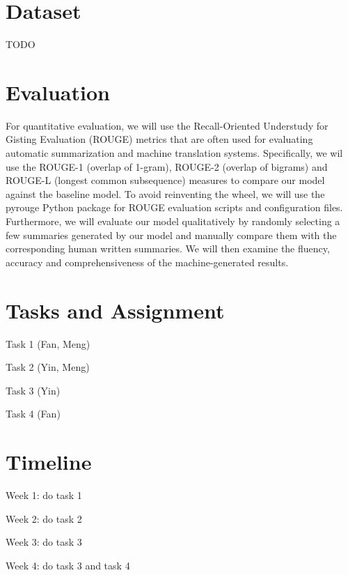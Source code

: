 \section{Dataset}
TODO

\section{Evaluation}
For quantitative evaluation, we will use the Recall-Oriented Understudy for Gisting Evaluation (ROUGE) metrics that are often used for evaluating automatic summarization and machine translation systems. Specifically, we wil use the ROUGE-1 (overlap of 1-gram), ROUGE-2 (overlap of bigrams) and ROUGE-L (longest common subsequence) measures to compare our model against the baseline model. To avoid reinventing the wheel, we will use the pyrouge  Python package for ROUGE evaluation scripts and configuration files.  Furthermore, we will evaluate our model qualitatively by randomly selecting a few summaries generated by our model and manually compare them with the corresponding human written summaries. We will then examine the fluency, accuracy and comprehensiveness of the machine-generated results.

\section{Tasks and Assignment}

\begin{compactitem}
\item Task 1 (Fan, Meng)
\item Task 2 (Yin, Meng)
\item Task 3 (Yin)
\item Task 4 (Fan)
\end{compactitem}


\section{Timeline}
\begin{compactitem}
\item Week 1: do task 1
\item Week 2: do task 2
\item Week 3: do task 3
\item Week 4: do task 3 and task 4
\end{compactitem}

\newpage


